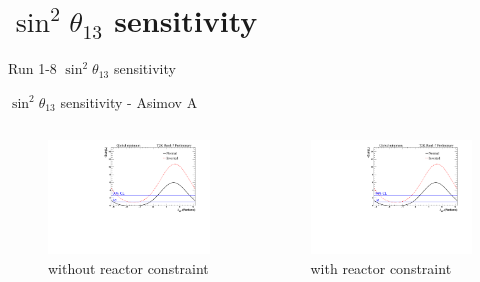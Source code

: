 \documentclass{beamer}
\newcommand{\sinsqthetaonethree}{$\sin^2\theta_{13}$\xspace}
\begin{document}
\section{\sinsqthetaonethree sensitivity}
\begin{frame}
	\centering
	\Large Run 1-8 \sinsqthetaonethree sensitivity\\
\end{frame}

\begin{frame}{\sinsqthetaonethree sensitivity - Asimov A}
	\centering
	\begin{columns}
		\begin{column}{0.5\paperwidth}
			\begin{figure}
				\includegraphics[trim={0cm 0cm 0cm 0cm}, clip, scale=0.33] {images/sensitivity/th13_global_t2k}
				\caption*{without reactor constraint}
			\end{figure}
		\end{column}
		\begin{column}{0.5\paperwidth}
			\begin{figure}
				\includegraphics[trim={0cm 0cm 0cm 0cm}, clip, scale=0.33] {images/sensitivity/th13_global_t2k}
				\caption*{with reactor constraint}
			\end{figure}
		\end{column}
	\end{columns}
\end{frame}
\end{document}
